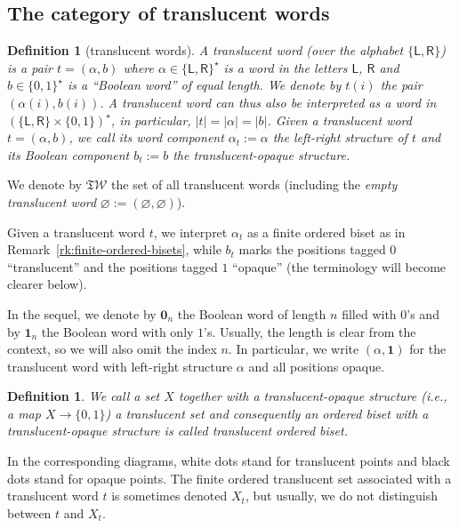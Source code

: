\documentclass[pdftex]{sigma}
\newcommand{\SWc}{{\mathfrak{T}\mathcal{W}}}
\newcommand\LL{{\mathsf{L}}}
\newcommand\RR{{\mathsf{R}}}
\numberwithin{equation}{section}
\newtheorem{Definition}[Theorem]{Definition}
\begin{document}
\subsection{The category of translucent words}
\label{subsec:category-of-translucent-words}

\begin{Definition}[translucent words]	\label{def:translucentword}
 A {\it translucent word} (over the alphabet $\{\LL,\RR\}$) is a pair $t=(\alpha,b)$
	where
 $\alpha \in \{ \LL, \RR \}^\star$ is a word in the letters $\LL$, $\RR$ and $b \in \{0,1\}^\star$ is a ``Boolean word'' of equal length. We denote by $t(i)$ the pair $(\alpha(i),b(i))$. A translucent word can thus also be interpreted as a word in $(\{\LL,\RR\}\times\{0,1\})^\star$, in particular, $|t|=|\alpha|=|b|$. Given a translucent word $t=(\alpha,b)$, we call its word component $\alpha_t:=\alpha$ the {\it left-right structure} of $t$ and its Boolean component $b_t:=b$ the {\it translucent-opaque structure}.
\end{Definition}
We denote by $\SWc$ the set of all translucent words (including the {\it empty translucent word} $\varnothing := (\varnothing,\varnothing)$).

Given a translucent word $t$, we interpret $\alpha_t$ as a finite ordered biset as in Remark~\ref{rk:finite-ordered-bisets}, while $b_t$ marks the positions tagged $0$ ``translucent'' and the positions tagged $1$ ``opaque'' (the terminology will become clearer below).

In the sequel, we denote by ${\mathbf{0}}_n$ the Boolean word of length $n$ filled with $0$'s and by ${\mathbf{1}}_n$ the Boolean word with only $1$'s. Usually, the length is clear from the context, so we will also omit the index $n$. In particular, we write $(\alpha,\mathbf{1})$ for the translucent word with left-right structure $\alpha$ and all positions opaque.


 \begin{Definition}
 We call a set $X$ together with a \emph{translucent-opaque} structure (i.e., a map $X\to\{0,1\}$) a {\it translucent set} and consequently an ordered biset with a translucent-opaque structure is called {\it translucent ordered biset}.
 \end{Definition}
 In the corresponding diagrams, white dots stand for translucent points and black dots stand for opaque points. The finite ordered translucent set associated with a translucent word $t$ is sometimes denoted $X_t$, but usually, we do not distinguish between $t$ and $X_t$.
\end{document}
